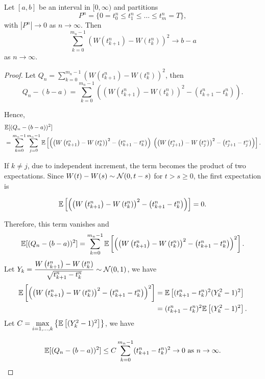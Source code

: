 \begin{theorem}
  \label{theorem:quadratic-variation}
  Let $[a, b]$ be an interval in $[0,\infty)$ and partitions
  $$P^n=\{0=t_0^n\le t_1^n\le\ldots\le t_m^n=T\},$$
  with $\left|P^n\right|\to0$ as $n\to\infty$. Then
  \begin{equation}
    \sum\limits_{k=0}^{m_n-1}\left(W\left(t_{k+1}^n\right)-W\left(t_k^n\right)\right)^2\to b-a
  \end{equation}
  as $n\to\infty$.
\end{theorem}

\begin{proof}
  Let $Q_n=\sum\limits_{k=0}^{m_n-1}\left(W\left(t_{k+1}^n\right)-W\left(t_k^n\right)\right)^2$, then
  $$Q_n-(b-a)=\sum\limits_{k=0}^{m_n-1}\left(\left(W\left(t_{k+1}^n\right)-W\left(t_k^n\right)\right)^2-\left(t^n_{k+1}-t^n_k\right)\right).$$

  Hence,
  \begin{align*}
     & \mathbb{E}[(Q_n-(b-a))^2]                                                                                                                                                                                                                                                                           \\
     & =\sum\limits_{k=0}^{m_n-1}\sum\limits_{j=0}^{m_n-1}\mathbb{E}  \left[\left(\left(W\left(t_{k+1}^n\right)-W\left(t_k^n\right)\right)^2-\left(t^n_{k+1}-t^n_k\right)\right)\right. \left.\left(\left(W\left(t_{j+1}^n\right)-W\left(t_j^n\right)\right)^2-\left(t^n_{j+1}-t^n_j\right)\right)\right].
  \end{align*}

  If $k\ne j$, due to independent increment, the term becomes the product of two expectations. Since $W(t)-W(s)\sim \mathcal{N}(0,t-s)$ for $t>s\ge 0$, the first expectation is

  $$\mathbb{E}\left[\left(\left(W\left(t_{k+1}^n\right)-W\left(t_k^n\right)\right)^2-\left(t^n_{k+1}-t^n_k\right)\right)\right]=0.$$

  Therefore, this term vanishes and
  \begin{align*}
    \mathbb{E}[(Q_n-(b-a))^2]=\sum\limits_{k=0}^{m_n-1}\mathbb{E}\left[\left(\left(W\left(t_{k+1}^n\right)-W\left(t_k^n\right)\right)^2-\left(t^n_{k+1}-t^n_k\right)\right)^2\right].
  \end{align*}
  Let $Y_k = \dfrac{W\left(t_{k+1}^n\right)-W\left(t_k^n\right)}{\sqrt{t_{k+1}^n-t_k^n}}\sim\mathcal{N}(0,1)$, we have
  \begin{align*}
    \mathbb{E}\left[\left(\left(W\left(t_{k+1}^n\right)-W\left(t_k^n\right)\right)^2-\left(t^n_{k+1}-t^n_k\right)\right)^2\right] & =\mathbb{E}\left[(t^n_{k+1}-t^n_k)^2(Y_k^2-1)^2\right]  \\
                                                                                                                           & =(t^n_{k+1}-t^n_k)^2\mathbb{E}\left[(Y_k^2-1)^2\right].
  \end{align*}
  Let $C=\max\limits_{i=1,\ldots,k}\left\{\mathbb{E}\left[(Y_k^2-1)^2\right]\right\}$, we have

  $$\mathbb{E}[(Q_n-(b-a))^2]\le C\sum\limits_{k=0}^{m_n-1}(t^n_{k+1}-t^n_k)^2\to 0 \text{ as } n\to\infty.$$
\end{proof}

